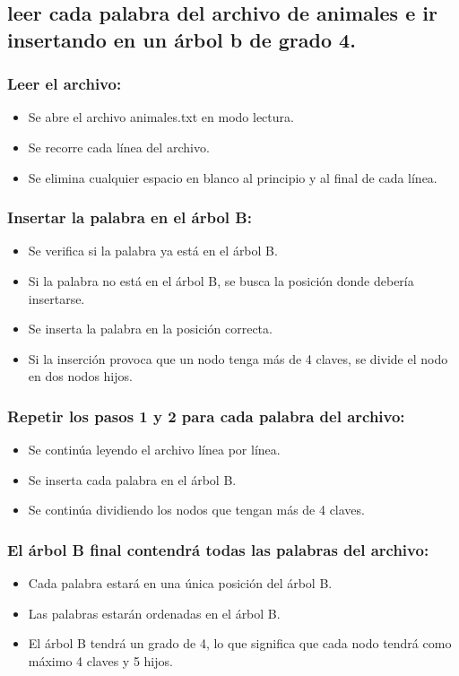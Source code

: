 \subsection{leer cada palabra del archivo de animales e ir insertando en un árbol b de grado 4.}

\subsubsection{Leer el archivo:}

\begin{itemize}
  \item Se abre el archivo animales.txt en modo lectura.
  \item Se recorre cada línea del archivo.
  \item Se elimina cualquier espacio en blanco al principio y al final de cada línea.
\end{itemize}

\subsubsection{Insertar la palabra en el árbol B:}
\begin{itemize}
  \item Se verifica si la palabra ya está en el árbol B.
  \item Si la palabra no está en el árbol B, se busca la posición donde debería insertarse.
  \item Se inserta la palabra en la posición correcta.
  \item Si la inserción provoca que un nodo tenga más de 4 claves, se divide el nodo en dos nodos hijos.
\end{itemize}

\subsubsection{Repetir los pasos 1 y 2 para cada palabra del archivo:}
\begin{itemize}
  \item Se continúa leyendo el archivo línea por línea.
  \item Se inserta cada palabra en el árbol B.
  \item Se continúa dividiendo los nodos que tengan más de 4 claves.
\end{itemize}

\subsubsection{El árbol B final contendrá todas las palabras del archivo:}
\begin{itemize}
  \item Cada palabra estará en una única posición del árbol B.
  \item Las palabras estarán ordenadas en el árbol B.
  \item El árbol B tendrá un grado de 4, lo que significa que cada nodo tendrá como máximo 4 claves y 5 hijos.
\end{itemize}


